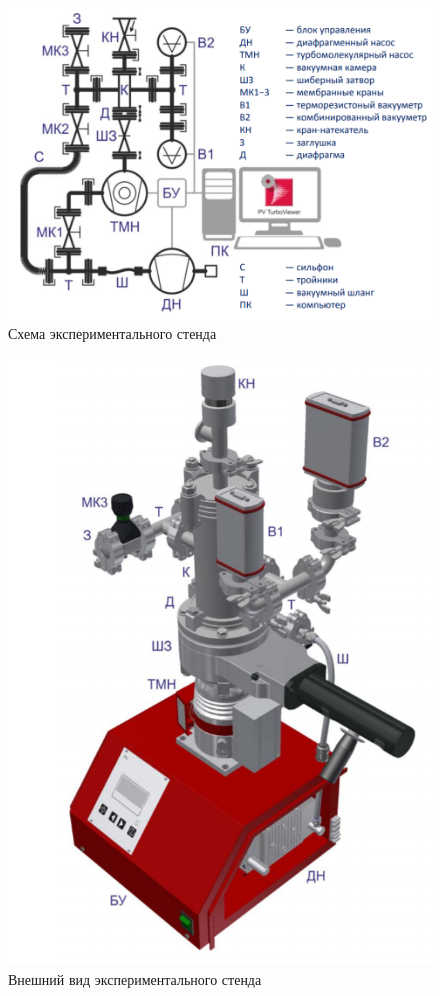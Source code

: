 \documentclass[12pt,a4paper]{article}
\begin{document}
	
	\begin{figure}[H]
		\centering
		\includegraphics[width = 11.5 cm]{res/scheme.png}
		\caption{Схема экспериментального стенда}
		\label{fig:vac}
	\end{figure}
	\begin{figure}[H]
		\centering
		\includegraphics[width = 6.5 cm]{res/picture.png}
		\caption{Внешний вид экспериментального стенда}
		\label{fig:vac}
	\end{figure}
	
\end{document}
